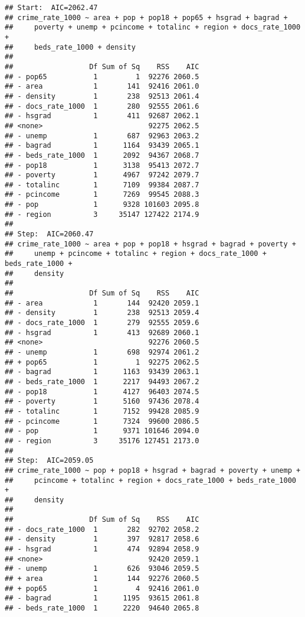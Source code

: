 \documentclass[
  11pt,
]{article}
\begin{document}
\begin{verbatim}
## Start:  AIC=2062.47
## crime_rate_1000 ~ area + pop + pop18 + pop65 + hsgrad + bagrad + 
##     poverty + unemp + pcincome + totalinc + region + docs_rate_1000 + 
##     beds_rate_1000 + density
## 
##                  Df Sum of Sq    RSS    AIC
## - pop65           1         1  92276 2060.5
## - area            1       141  92416 2061.0
## - density         1       238  92513 2061.4
## - docs_rate_1000  1       280  92555 2061.6
## - hsgrad          1       411  92687 2062.1
## <none>                         92275 2062.5
## - unemp           1       687  92963 2063.2
## - bagrad          1      1164  93439 2065.1
## - beds_rate_1000  1      2092  94367 2068.7
## - pop18           1      3138  95413 2072.7
## - poverty         1      4967  97242 2079.7
## - totalinc        1      7109  99384 2087.7
## - pcincome        1      7269  99545 2088.3
## - pop             1      9328 101603 2095.8
## - region          3     35147 127422 2174.9
## 
## Step:  AIC=2060.47
## crime_rate_1000 ~ area + pop + pop18 + hsgrad + bagrad + poverty + 
##     unemp + pcincome + totalinc + region + docs_rate_1000 + beds_rate_1000 + 
##     density
## 
##                  Df Sum of Sq    RSS    AIC
## - area            1       144  92420 2059.1
## - density         1       238  92513 2059.4
## - docs_rate_1000  1       279  92555 2059.6
## - hsgrad          1       413  92689 2060.1
## <none>                         92276 2060.5
## - unemp           1       698  92974 2061.2
## + pop65           1         1  92275 2062.5
## - bagrad          1      1163  93439 2063.1
## - beds_rate_1000  1      2217  94493 2067.2
## - pop18           1      4127  96403 2074.5
## - poverty         1      5160  97436 2078.4
## - totalinc        1      7152  99428 2085.9
## - pcincome        1      7324  99600 2086.5
## - pop             1      9371 101646 2094.0
## - region          3     35176 127451 2173.0
## 
## Step:  AIC=2059.05
## crime_rate_1000 ~ pop + pop18 + hsgrad + bagrad + poverty + unemp + 
##     pcincome + totalinc + region + docs_rate_1000 + beds_rate_1000 + 
##     density
## 
##                  Df Sum of Sq    RSS    AIC
## - docs_rate_1000  1       282  92702 2058.2
## - density         1       397  92817 2058.6
## - hsgrad          1       474  92894 2058.9
## <none>                         92420 2059.1
## - unemp           1       626  93046 2059.5
## + area            1       144  92276 2060.5
## + pop65           1         4  92416 2061.0
## - bagrad          1      1195  93615 2061.8
## - beds_rate_1000  1      2220  94640 2065.8

\end{verbatim}
\end{document}
